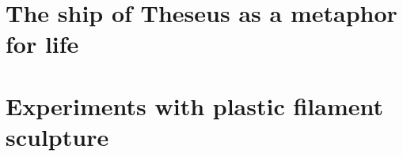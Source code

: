 \section{The ship of Theseus as a metaphor for life}

\section{Experiments with plastic filament sculpture}

